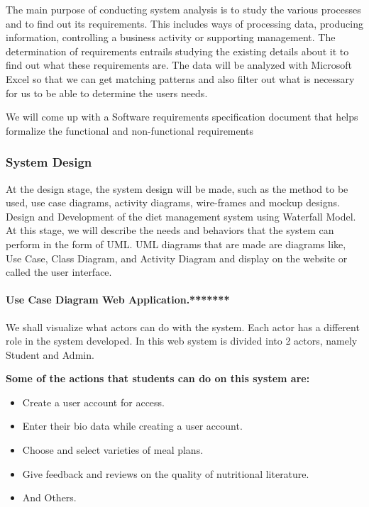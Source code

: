 \documentclass{article}
\begin{document}
The main purpose of conducting system analysis is to study the various processes and to find out its requirements. This includes ways of processing data, producing information, controlling a business activity or supporting management. The determination of requirements entrails studying the existing details about it to find out what these requirements are. The data will be analyzed with Microsoft Excel so that we can get matching patterns and also filter out what is necessary for us to be able to determine the users needs.

We will come up with a Software requirements specification document that helps formalize the functional and non-functional requirements

\subsubsection{System Design}
At the design stage, the system design will be made, such as the method to be used, use case diagrams, activity diagrams, wire-frames and mockup designs. Design and Development of the diet management system using Waterfall Model. At this stage, we will describe the needs and behaviors that the system can perform in the form of UML. UML diagrams that are made are diagrams like, Use Case, Class Diagram, and Activity Diagram and display on the website or called the user interface.

\paragraph{Use Case Diagram Web Application.******* \\}
We shall visualize what actors can do with the system. Each actor has a different role in the system developed. In this web system is divided into 2 actors, namely Student and Admin.

\textbf{Some of the actions that students can do on this system are:}
\begin{itemize}
\item Create a user account for access.
\item Enter their bio data while creating a user account.
\item Choose and select varieties of meal plans.
\item Give feedback and reviews on the quality of nutritional literature.
\item And Others.
\end{itemize}
\end{document}
